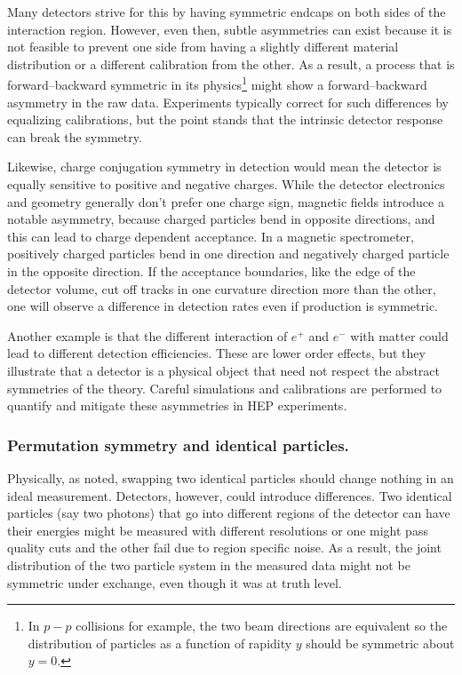             Many detectors strive for this by having symmetric endcaps on both sides of the interaction region.
            However, even then, subtle asymmetries can exist because it is not feasible to prevent one side from having a slightly different material distribution or a different calibration from the other.
            As a result, a process that is forward--backward symmetric in its physics\footnote{In $p-p$ collisions for example, the two beam directions are equivalent so the distribution of particles as a function of rapidity $y$ should be symmetric about $y=0$.} might show a forward--backward asymmetry in the raw data.
            Experiments typically correct for such differences by equalizing calibrations, but the point stands that the intrinsic detector response can break the symmetry.
            
            Likewise, charge conjugation symmetry in detection would mean the detector is equally sensitive to positive and negative charges.
            While the detector electronics and geometry generally don’t prefer one charge sign, magnetic fields introduce a notable asymmetry, because charged particles bend in opposite directions, and this can lead to charge dependent acceptance.
            In a magnetic spectrometer, positively charged particles bend in one direction and negatively charged particle in the opposite direction.
            If the acceptance boundaries, like the edge of the detector volume, cut off tracks in one curvature direction more than the other, one will observe a difference in detection rates even if production is symmetric.
            
            Another example is that the different interaction of $e^+$ and $e^-$ with matter could lead to different detection efficiencies.
            These are lower order effects, but they illustrate that a detector is a physical object that need not respect the abstract symmetries of the theory.
            Careful simulations and calibrations are performed to quantify and mitigate these asymmetries in HEP experiments.

        \subsubsection{Permutation symmetry and identical particles.}

            Physically, as noted, swapping two identical particles should change nothing in an ideal measurement.
            Detectors, however, could introduce differences.
            Two identical particles (say two photons) that go into different regions of the detector can have their energies might be measured with different resolutions or one might pass quality cuts and the other fail due to region specific noise. 
            As a result, the joint distribution of the two particle system in the measured data might not be symmetric under exchange, even though it was at truth level.
            
